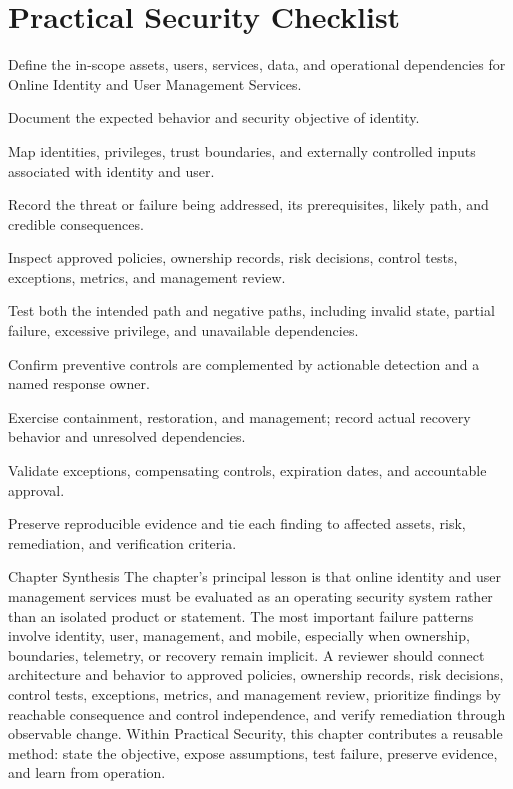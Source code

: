 \documentclass[11pt,letterpaper]{article}
\begin{document}
\section*{Practical Security Checklist}
\begin{CornellChecklist}
\item Define the in-scope assets, users, services, data, and operational dependencies for Online Identity and User Management Services.
\item Document the expected behavior and security objective of identity.
\item Map identities, privileges, trust boundaries, and externally controlled inputs associated with identity and user.
\item Record the threat or failure being addressed, its prerequisites, likely path, and credible consequences.
\item Inspect approved policies, ownership records, risk decisions, control tests, exceptions, metrics, and management review.
\item Test both the intended path and negative paths, including invalid state, partial failure, excessive privilege, and unavailable dependencies.
\item Confirm preventive controls are complemented by actionable detection and a named response owner.
\item Exercise containment, restoration, and management; record actual recovery behavior and unresolved dependencies.
\item Validate exceptions, compensating controls, expiration dates, and accountable approval.
\item Preserve reproducible evidence and tie each finding to affected assets, risk, remediation, and verification criteria.
\end{CornellChecklist}
\begin{CornellSummaryBox}{Chapter Synthesis}
The chapter's principal lesson is that online identity and user management services must be evaluated as an operating security system rather than an isolated product or statement. The most important failure patterns involve identity, user, management, and mobile, especially when ownership, boundaries, telemetry, or recovery remain implicit. A reviewer should connect architecture and behavior to approved policies, ownership records, risk decisions, control tests, exceptions, metrics, and management review, prioritize findings by reachable consequence and control independence, and verify remediation through observable change. Within Practical Security, this chapter contributes a reusable method: state the objective, expose assumptions, test failure, preserve evidence, and learn from operation.
\end{CornellSummaryBox}
\end{document}
